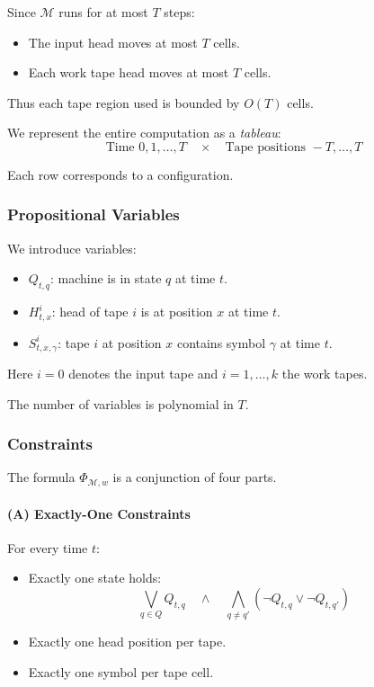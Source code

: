\documentclass{article}
\begin{document}
Since $\mathcal{M}$ runs for at most $T$ steps:

\begin{itemize}
    \item The input head moves at most $T$ cells.
    \item Each work tape head moves at most $T$ cells.
\end{itemize}

Thus each tape region used is bounded by $O(T)$ cells.

We represent the entire computation as a \emph{tableau}:
\[
\text{Time } 0,1,\dots,T
\quad \times \quad
\text{Tape positions } -T,\dots,T
\]

Each row corresponds to a configuration.

\subsubsection*{Propositional Variables}

We introduce variables:

\begin{itemize}
    \item $Q_{t,q}$: machine is in state $q$ at time $t$.
    \item $H^i_{t,x}$: head of tape $i$ is at position $x$ at time $t$.
    \item $S^i_{t,x,\gamma}$: tape $i$ at position $x$ contains symbol $\gamma$
    at time $t$.
\end{itemize}

Here $i=0$ denotes the input tape and $i=1,\dots,k$ the work tapes.

The number of variables is polynomial in $T$.

\subsubsection*{Constraints}

The formula $\Phi_{\mathcal{M},w}$ is a conjunction of four parts.

\paragraph{(A) Exactly-One Constraints}

For every time $t$:

\begin{itemize}
    \item Exactly one state holds:
    \[
    \bigvee_{q \in Q} Q_{t,q}
    \quad \land \quad
    \bigwedge_{q \neq q'} (\neg Q_{t,q} \lor \neg Q_{t,q'})
    \]
    \item Exactly one head position per tape.
    \item Exactly one symbol per tape cell.
\end{itemize}
\end{document}
